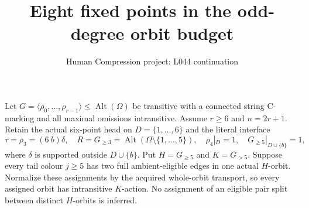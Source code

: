 \documentclass[11pt,a4paper]{article}
\title{Eight fixed points in the odd-degree orbit budget}
\author{Human Compression project: L044 continuation}
\date{}
\newcommand{\gen}[1]{\langle#1\rangle}
\newcommand{\Alt}{\operatorname{Alt}}
\begin{document}
\maketitle
Let $G=\gen{\rho_0,\ldots,\rho_{r-1}}\le\Alt(\Omega)$
be transitive with a connected string C-marking and all
maximal omissions intransitive. Assume $r\ge6$ and
$n=2r+1$. Retain the actual six-point head on
$D=\{1,\ldots,6\}$ and the literal interface
\[
 \tau=\rho_3=(6\ b)\delta,\quad
 R=G_{\ge3}=\Alt(\Omega\setminus\{1,\ldots,5\}),\quad
 \rho_4|_D=1,\quad G_{\ge5}|_{D\cup\{b\}}=1,
\]
where $\delta$ is supported outside $D\cup\{b\}$.
Put $H=G_{\ge5}$ and $K=G_{>5}$. Suppose every tail
colour $j\ge5$ has two full ambient-eligible edges in
one actual $H$-orbit. Normalize these assignments by the
acquired whole-orbit transport, so every assigned orbit
has intransitive $K$-action. No assignment of an eligible
pair split between distinct $H$-orbits is inferred.
\end{document}
